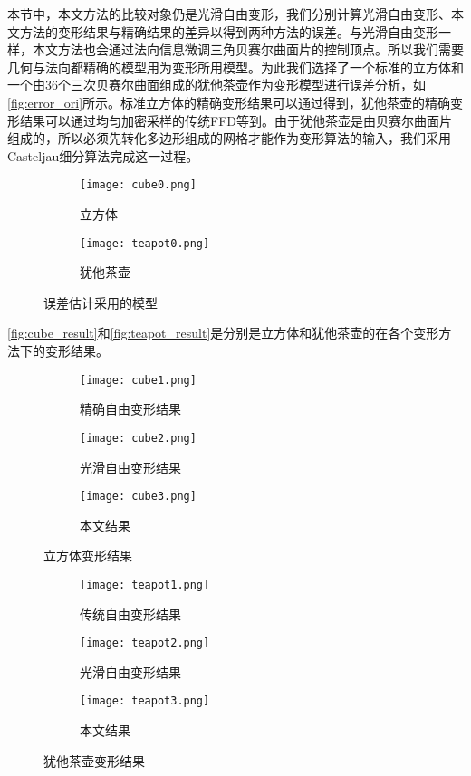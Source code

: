 本节中，本文方法的比较对象仍是光滑自由变形，我们分别计算光滑自由变形、本文方法的变形结果与精确结果的差异以得到两种方法的误差。与光滑自由变形一样，本文方法也会通过法向信息微调三角贝赛尔曲面片的控制顶点。所以我们需要几何与法向都精确的模型用为变形所用模型。为此我们选择了一个标准的立方体和一个由36个三次贝赛尔曲面组成的犹他茶壶作为变形模型进行误差分析，如\autoref{fig:error_ori}所示。标准立方体的精确变形结果可以通过\cite{Cui13, Cui14}得到，犹他茶壶的精确变形结果可以通过均匀加密采样的传统FFD等到。由于犹他茶壶是由贝赛尔曲面片组成的，所以必须先转化多边形组成的网格才能作为变形算法的输入，我们采用Casteljau细分算法完成这一过程。
\begin{figure}[htbp]
	\centering
	\begin{subfigure}[b]{.4\textwidth}
		\centering
		\texttt{[image: cube0.png]}
		\caption{立方体}\label{subfig:cube0}
	\end{subfigure}
	\quad
	\begin{subfigure}[b]{.4\textwidth}
		\centering
		\texttt{[image: teapot0.png]}
		\caption{犹他茶壶}\label{subfig:teapot0}
	\end{subfigure}
	\quad
	\caption{误差估计采用的模型}\label{fig:error_ori}
\end{figure}

\autoref{fig:cube_result}和\autoref{fig:teapot_result}是分别是立方体和犹他茶壶的在各个变形方法下的变形结果。

\begin{figure}[htbp]
	\centering
	\begin{subfigure}[b]{.3\textwidth}
		\centering
		\texttt{[image: cube1.png]}
		\caption{精确自由变形结果}\label{subfig:cube1}
	\end{subfigure}
	\begin{subfigure}[b]{.3\textwidth}
		\centering
		\texttt{[image: cube2.png]}
		\caption{光滑自由变形结果}\label{subfig:cube2}
	\end{subfigure}
	\begin{subfigure}[b]{.3\textwidth}
		\centering
		\texttt{[image: cube3.png]}
		\caption{本文结果}\label{subfig:cube3}
	\end{subfigure}
	\caption{立方体变形结果}\label{fig:cube_result}
\end{figure}

\begin{figure}[htbp]
	\centering
	\begin{subfigure}[b]{.3\textwidth}
		\centering
		\texttt{[image: teapot1.png]}
		\caption{传统自由变形结果}\label{subfig:teapot1}
	\end{subfigure}
	\begin{subfigure}[b]{.3\textwidth}
		\centering
		\texttt{[image: teapot2.png]}
		\caption{光滑自由变形结果}\label{subfig:teapot2}
	\end{subfigure}
	\begin{subfigure}[b]{.3\textwidth}
		\centering
		\texttt{[image: teapot3.png]}
		\caption{本文结果}\label{subfig:teapot3}
	\end{subfigure}
	\caption{犹他茶壶变形结果}\label{fig:teapot_result}
\end{figure}

